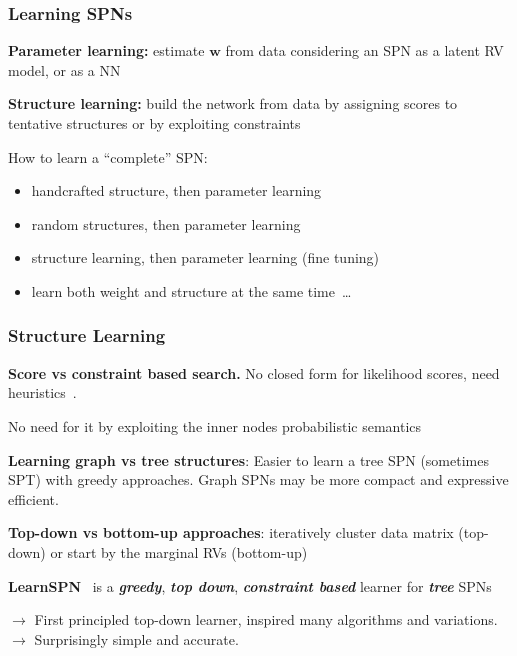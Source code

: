\documentclass[10pt, t, xcolor={usenames,dvipsnames,svgnames}, compress]{beamer}
\begin{document}
\begin{frame}
  \frametitle{Learning SPNs}

  \textbf{Parameter learning:} estimate $\mathbf{w}$ from data
  considering an SPN as a
  latent RV model, or as a NN\par\bigskip

  \textbf{Structure learning:} build the network from data by assigning
  scores to tentative structures or by exploiting constraints\par\bigskip

  How to learn a ``complete'' SPN:
  \begin{itemize}
  \item handcrafted structure, then parameter learning~\parencite{Poon2011,Gens2012}
  \item random structures, then parameter learning~\parencite{Rashwan2016}
  \item structure learning, then parameter learning (fine tuning)~\parencite{Zhao2016a}
  \item learn both weight and structure at the same time~\parencite{Gens2013,Rooshenas2014,Vergari2015,Adel2015}\dots  
  \end{itemize}
\end{frame}

\begin{frame}
  \frametitle{Structure Learning}

  \textbf{Score vs constraint based search.}
  No closed form for likelihood scores, need
  heuristics~\parencite{Rooshenas2014}.\par
  No need for it by exploiting the inner nodes probabilistic semantics\par\bigskip
  
  \textbf{Learning graph vs tree structures}:
  Easier to learn a tree SPN (sometimes SPT) with greedy
  approaches. Graph SPNs may be more compact and expressive efficient.\par\bigskip

  \textbf{Top-down vs bottom-up approaches}: iteratively cluster data
  matrix (top-down) or start by the marginal RVs (bottom-up)\par\bigskip

  \textbf{LearnSPN}~\parencite{Gens2013} is a \emph{\textbf{greedy}}, \emph{\textbf{top down}}, \emph{\textbf{constraint
  based}} learner for \emph{\textbf{tree}} SPNs\par
  $\rightarrow$ First principled top-down learner, inspired many algorithms and
  variations.
  $\rightarrow$ Surprisingly simple and accurate.
\end{frame}
\end{document}
